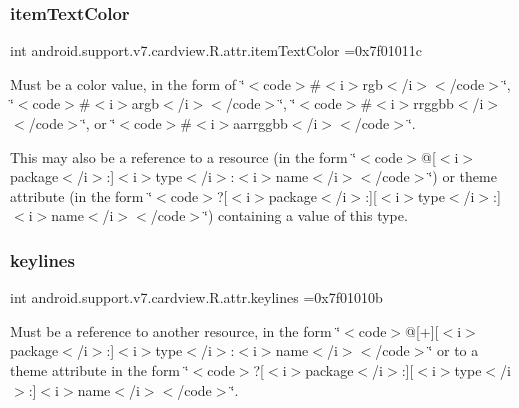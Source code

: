 \subsubsection{\texorpdfstring{item\+Text\+Color}{itemTextColor}}
{\footnotesize\ttfamily int android.\+support.\+v7.\+cardview.\+R.\+attr.\+item\+Text\+Color =0x7f01011c\hspace{0.3cm}{\ttfamily [static]}}

Must be a color value, in the form of \char`\"{}$<$code$>$\#$<$i$>$rgb$<$/i$>$$<$/code$>$\char`\"{}, \char`\"{}$<$code$>$\#$<$i$>$argb$<$/i$>$$<$/code$>$\char`\"{}, \char`\"{}$<$code$>$\#$<$i$>$rrggbb$<$/i$>$$<$/code$>$\char`\"{}, or \char`\"{}$<$code$>$\#$<$i$>$aarrggbb$<$/i$>$$<$/code$>$\char`\"{}. 

This may also be a reference to a resource (in the form \char`\"{}$<$code$>$@\mbox{[}$<$i$>$package$<$/i$>$\+:\mbox{]}$<$i$>$type$<$/i$>$\+:$<$i$>$name$<$/i$>$$<$/code$>$\char`\"{}) or theme attribute (in the form \char`\"{}$<$code$>$?\mbox{[}$<$i$>$package$<$/i$>$\+:\mbox{]}\mbox{[}$<$i$>$type$<$/i$>$\+:\mbox{]}$<$i$>$name$<$/i$>$$<$/code$>$\char`\"{}) containing a value of this type. \mbox{\label{classandroid_1_1support_1_1v7_1_1cardview_1_1R_1_1attr_ac25bc2cb240f07022d238edbb304cc92}} 
\subsubsection{\texorpdfstring{keylines}{keylines}}
{\footnotesize\ttfamily int android.\+support.\+v7.\+cardview.\+R.\+attr.\+keylines =0x7f01010b\hspace{0.3cm}{\ttfamily [static]}}

Must be a reference to another resource, in the form \char`\"{}$<$code$>$@\mbox{[}+\mbox{]}\mbox{[}$<$i$>$package$<$/i$>$\+:\mbox{]}$<$i$>$type$<$/i$>$\+:$<$i$>$name$<$/i$>$$<$/code$>$\char`\"{} or to a theme attribute in the form \char`\"{}$<$code$>$?\mbox{[}$<$i$>$package$<$/i$>$\+:\mbox{]}\mbox{[}$<$i$>$type$<$/i$>$\+:\mbox{]}$<$i$>$name$<$/i$>$$<$/code$>$\char`\"{}. \mbox{\label{classandroid_1_1support_1_1v7_1_1cardview_1_1R_1_1attr_a09b0bc987f2c5c9dac332b3eea8b0493}} 
